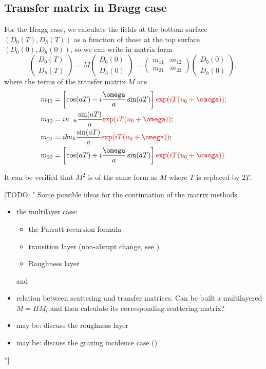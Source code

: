 \documentclass{iucr}
\newcommand{\todo}[1]{{\color{red}[TODO: "#1'']}}
\newcommand{\inred}[1]{{\color{red}#1}}
\begin{document}
\subsection{Transfer matrix in Bragg case}
For the Bragg case, we calculate the fields at the bottom surface $(D_0(T),D_h(T))$ as a function of those at the top surface $(D_0(0),D_h(0))$, so we can write in matrix form
\begin{equation}
    \begin{pmatrix}
    D_0(T)\\
    D_h(T)
    \end{pmatrix}
    =
    M
        \begin{pmatrix}
    D_0(0) \\
    D_h(0)
    \end{pmatrix}
    =
    \begin{pmatrix}
    m_{11} & m_{12}\\
    m_{21} & m_{22}
    \end{pmatrix}
    \begin{pmatrix}
    D_0(0) \\
    D_h(0)
    \end{pmatrix},
\end{equation}
where the terms of the transfer matrix $M$ are 
\begin{subequations}\label{eq:scatteringMatrixBragg }
\begin{align}
m_{11} &= \left[ \cos(aT)-i\frac{\omega}{a}\sin(aT) \right] \inred{\exp(i T (u_0+\omega))};\\
m_{12} &= i u_{-h}\frac{\sin(aT)}{a} \inred{\exp(i T (u_0+\omega))};\\
m_{21} &= i b u_h \frac{\sin(aT)}{a} \inred{\exp(i T (u_0+\omega))};\\
m_{22} &= \left[ \cos(aT)+i \frac{\omega}{a}\sin(aT) \right] \inred{\exp(i T (u_0+\omega))}.
\end{align}
\end{subequations}

It can be verified that $M^2$ is of the same form as $M$ where $T$ is replaced by $2T$. 

\todo{ Some possible ideas for the continuation of the matrix methods
\begin{itemize}
    \item the multilayer case:
    \begin{itemize}
        \item the Parratt recursion formula
        \item transition layer (non-abrupt change, see \cite{Lobach})
        \item Roughness layer
    \end{itemize}and 
    \item relation between scattering and transfer matrices. Can be built a multilayered $M=\Pi M_i$ and then calculate its corresponding scattering matrix?
    \item may be: discuss the roughness layer
    \item may be: discuss the grazing incidence case (\cite{Yashiro2001, Stepanov1998})
\end{itemize}
}
\end{document}
